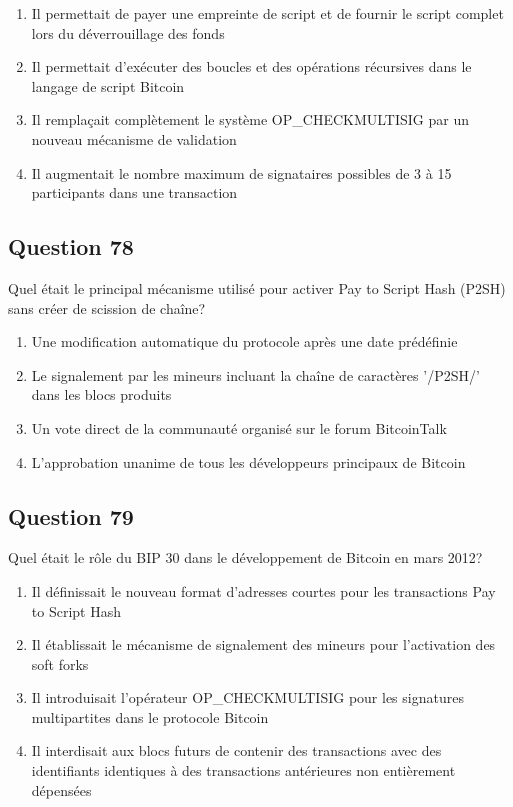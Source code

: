 \documentclass[12pt,a4paper]{article}
\begin{document}
\begin{enumerate}[label=\Alph*., leftmargin=*]
\item Il permettait de payer une empreinte de script et de fournir le script complet lors du déverrouillage des fonds
\item Il permettait d'exécuter des boucles et des opérations récursives dans le langage de script Bitcoin
\item Il remplaçait complètement le système OP_CHECKMULTISIG par un nouveau mécanisme de validation
\item Il augmentait le nombre maximum de signataires possibles de 3 à 15 participants dans une transaction
\end{enumerate}

\bigskip


\subsection*{Question 78}
Quel était le principal mécanisme utilisé pour activer Pay to Script Hash (P2SH) sans créer de scission de chaîne?

\begin{enumerate}[label=\Alph*., leftmargin=*]
\item Une modification automatique du protocole après une date prédéfinie
\item Le signalement par les mineurs incluant la chaîne de caractères '/P2SH/' dans les blocs produits
\item Un vote direct de la communauté organisé sur le forum BitcoinTalk
\item L'approbation unanime de tous les développeurs principaux de Bitcoin
\end{enumerate}

\bigskip


\subsection*{Question 79}
Quel était le rôle du BIP 30 dans le développement de Bitcoin en mars 2012?

\begin{enumerate}[label=\Alph*., leftmargin=*]
\item Il définissait le nouveau format d'adresses courtes pour les transactions Pay to Script Hash
\item Il établissait le mécanisme de signalement des mineurs pour l'activation des soft forks
\item Il introduisait l'opérateur OP_CHECKMULTISIG pour les signatures multipartites dans le protocole Bitcoin
\item Il interdisait aux blocs futurs de contenir des transactions avec des identifiants identiques à des transactions antérieures non entièrement dépensées
\end{enumerate}
\end{document}
